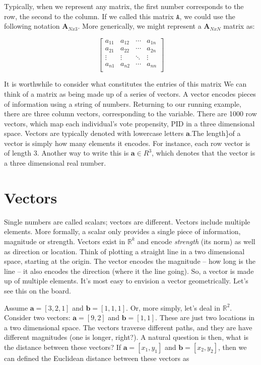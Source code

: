 \documentclass[
]{book}
\begin{document}
Typically, when we represent any matrix, the first number corresponds to
the row, the second to the column. If we called this matrix
\(\texttt{A}\), we could use the following notation \(\textbf{A}_{Nx3}\).
More generically, we might represent a \(\textbf{A}_{NxN}\) matrix as:

\[
\begin{bmatrix}
a_{11}&a_{12}&\cdots &a_{1n} \\
a_{21}&a_{22}&\cdots &a_{2n} \\
\vdots & \vdots & \ddots & \vdots\\
a_{n1}&a_{n2}&\cdots &a_{nn}\\
\end{bmatrix}
\]

It is worthwhile to consider what constitutes the entries of this matrix
We can think of a matrix as being made up of a series of vectors. A
vector encodes pieces of information using a string of numbers.
Returning to our running example, there are three column vectors,
corresponding to the variable. There are 1000 row vectors, which map
each individual's vote propensity, PID in a three dimensional space.
Vectors are typically denoted with lowercase letters \(\textbf{a}\).The
length\}of a vector is simply how many elements it encodes. For instance,
each row vector is of length 3. Another way to write this is
\(\textbf{a} \in R^{3}\), which denotes that the vector is a three
dimensional real number.

\section{Vectors}\label{vectors}

Single numbers are called scalars; vectors are different. Vectors
include multiple elements. More formally, a scalar only provides a
single piece of information, magnitude or strength. Vectors exist in
\(\mathbb{R}^{k}\) and encode \emph{strength} (its norm) as well as direction or
location. Think of plotting a straight line in a two dimensional space,
starting at the origin. The vector encodes the magnitude -- how long is
the line -- it also encodes the direction (where it the line going). So,
a vector is made up of multiple elements. It's most easy to envision a
vector geometrically. Let's see this on the board.

Assume \(\textbf{a}=[3,2,1]\) and \(\textbf{b}=[1,1,1]\). Or, more simply,
let's deal in \(\mathbb{R}^{2}\). Consider two vectors: \(\textbf{a}=[9,2]\) and
\(\textbf{b}=[1,1]\). These are just two locations in a two dimensional
space. The vectors traverse different paths, and they are have different
magnitudes (one is longer, right?). A natural question is then, what is
the distance between these vectors? If \(\textbf{a}=[x_1,y_1]\) and
\(\textbf{b}=[x_2,y_2]\), then we can defined the Euclidean distance
between these vectors as
\end{document}

